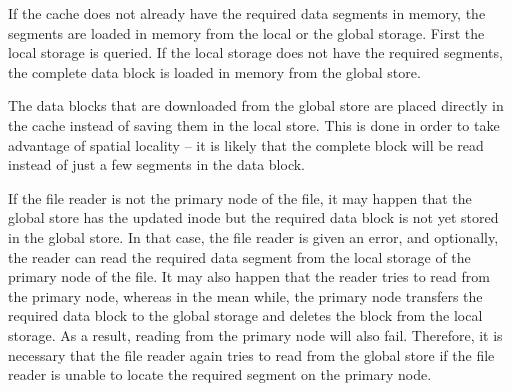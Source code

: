 \documentclass[]{article}
\begin{document}
If the cache does not already have the required data segments in memory,
the segments are loaded in memory from the local or the global storage.  First
the local storage is queried. If the local storage does not have the required
segments, the complete data block is loaded in memory from the global store.

The data blocks that are downloaded from the global store are placed directly
in the cache instead of saving them in the local store. This is done in order
to take advantage of spatial locality -- it is likely that the complete
block will be read instead of just a few segments in the data block.


If the file reader is not the primary node of the file, it may happen that
the global store has the updated inode but the required data block is not yet
stored in the global store. In that case, the file reader is given an error,
and optionally, the reader can read the required data segment from the local
storage of the primary node of the file. It may also happen that the reader
tries to read from the primary node, whereas in the mean while, the primary node 
transfers the required data block to the global storage and deletes the
block from the local storage. As a result, reading from the primary node
will also fail. Therefore, it is necessary that the file reader
again tries to read from the global store if the file reader is unable to
locate the required segment on the primary node. 




%
%
%

%
%
%
%
%
%
%
%
%
%
%
%
\end{document}
